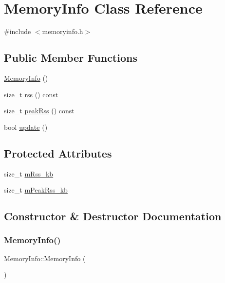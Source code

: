 \hypertarget{class_memory_info}{}\section{Memory\+Info Class Reference}
\label{class_memory_info}


{\ttfamily \#include $<$memoryinfo.\+h$>$}

\subsection*{Public Member Functions}
\begin{DoxyCompactItemize}
\item 
\mbox{\hyperlink{class_memory_info_a7f57d909290d19618bc6721b9d6e43bc}{Memory\+Info}} ()
\item 
size\+\_\+t \mbox{\hyperlink{class_memory_info_ae2c3e230e00b975a480f9ba4758472a3}{rss}} () const
\item 
size\+\_\+t \mbox{\hyperlink{class_memory_info_a102b1578e4a42b23a7eba00b7dbfa23d}{peak\+Rss}} () const
\item 
bool \mbox{\hyperlink{class_memory_info_a19b7e08fc6b39094e266ba827948cd7e}{update}} ()
\end{DoxyCompactItemize}
\subsection*{Protected Attributes}
\begin{DoxyCompactItemize}
\item 
size\+\_\+t \mbox{\hyperlink{class_memory_info_aace36f5e4912e28d170d343ba0b2c59a}{m\+Rss\+\_\+kb}}
\item 
size\+\_\+t \mbox{\hyperlink{class_memory_info_ac6335a85d395257e8e39a9ed8ef498a7}{m\+Peak\+Rss\+\_\+kb}}
\end{DoxyCompactItemize}


\subsection{Constructor \& Destructor Documentation}
\mbox{\label{class_memory_info_a7f57d909290d19618bc6721b9d6e43bc}} 
\subsubsection{\texorpdfstring{MemoryInfo()}{MemoryInfo()}}
{\footnotesize\ttfamily Memory\+Info\+::\+Memory\+Info (\begin{DoxyParamCaption}{ }\end{DoxyParamCaption})}



